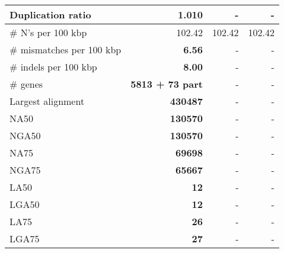 \documentclass[12pt,a4paper]{article}
\begin{document}
\begin{table}[ht]
\begin{center}
\begin{tabular}{|l*{3}{|r}|}
Duplication ratio & {\bf 1.010} & - & - \\ \hline
\# N's per 100 kbp & 102.42 & 102.42 & 102.42 \\ \hline
\# mismatches per 100 kbp & {\bf 6.56} & - & - \\ \hline
\# indels per 100 kbp & {\bf 8.00} & - & - \\ \hline
\# genes & {\bf 5813 + 73 part} & - & - \\ \hline
Largest alignment & {\bf 430487} & - & - \\ \hline
NA50 & {\bf 130570} & - & - \\ \hline
NGA50 & {\bf 130570} & - & - \\ \hline
NA75 & {\bf 69698} & - & - \\ \hline
NGA75 & {\bf 65667} & - & - \\ \hline
LA50 & {\bf 12} & - & - \\ \hline
LGA50 & {\bf 12} & - & - \\ \hline
LA75 & {\bf 26} & - & - \\ \hline
LGA75 & {\bf 27} & - & - \\ \hline
\end{tabular}
\end{center}
\end{table}
\end{document}
